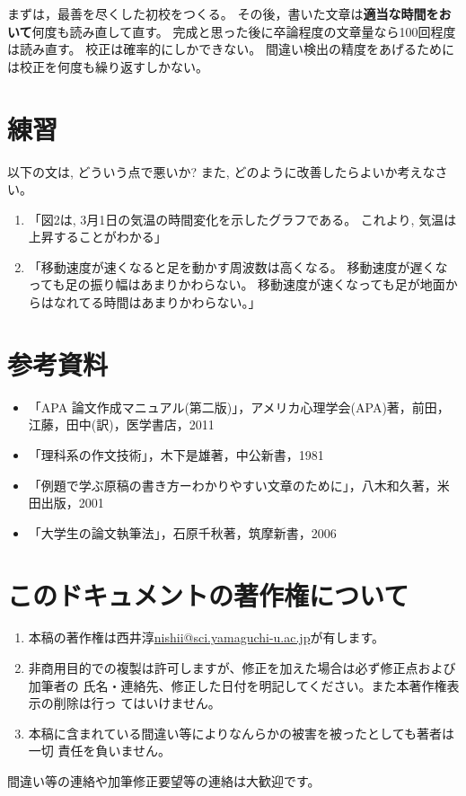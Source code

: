 \documentclass[12pt, ]{jsarticle}
\providecommand{\tightlist}{%
   \setlength{\itemsep}{0pt}\setlength{\parskip}{0pt}}
\begin{document}
まずは，最善を尽くした初校をつくる。
その後，書いた文章は\textbf{適当な時間をおいて}何度も読み直して直す。
完成と思った後に卒論程度の文章量なら100回程度は読み直す。
校正は確率的にしかできない。
間違い検出の精度をあげるためには校正を何度も繰り返すしかない。

\hypertarget{ux7df4ux7fd2}{%
\section{練習}\label{ux7df4ux7fd2}}

以下の文は, どういう点で悪いか? また,
どのように改善したらよいか考えなさい。

\begin{enumerate}
\item
  「図2は, 3月1日の気温の時間変化を示したグラフである。 これより,
  気温は上昇することがわかる」
\item
  「移動速度が速くなると足を動かす周波数は高くなる。
  移動速度が遅くなっても足の振り幅はあまりかわらない。
  移動速度が速くなっても足が地面からはなれてる時間はあまりかわらない。」
\end{enumerate}

\hypertarget{ux305dux306eux4ed6ux53c2ux8003ux306bux306aux308bux8cc7ux6599}{%
\section*{参考資料}\label{ux305dux306eux4ed6ux53c2ux8003ux306bux306aux308bux8cc7ux6599}}

\begin{itemize}
\tightlist
\item
  「APA
  論文作成マニュアル(第二版)」，アメリカ心理学会(APA)著，前田，江藤，田中(訳)，医学書店，2011
\item
  「理科系の作文技術」，木下是雄著，中公新書，1981
\item
  「例題で学ぶ原稿の書き方ーわかりやすい文章のために」，八木和久著，米田出版，2001
\item
  「大学生の論文執筆法」，石原千秋著，筑摩新書，2006
\end{itemize}

\hypertarget{ux8457ux4f5cux6a29}{%
\section*{このドキュメントの著作権について}\label{ux8457ux4f5cux6a29}}

\begin{enumerate}
\item
  本稿の著作権は西井淳\url{nishii@sci.yamaguchi-u.ac.jp}が有します。
\item
  非商用目的での複製は許可しますが、修正を加えた場合は必ず修正点および加筆者の
  氏名・連絡先、修正した日付を明記してください。また本著作権表示の削除は行っ
  てはいけません。
\item
  本稿に含まれている間違い等によりなんらかの被害を被ったとしても著者は一切
  責任を負いません。
\end{enumerate}

間違い等の連絡や加筆修正要望等の連絡は大歓迎です。
\end{document}
